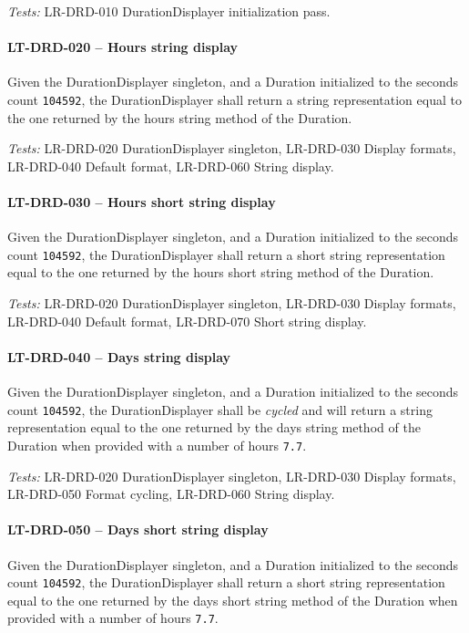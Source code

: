 \textit{Tests: } LR-DRD-010 DurationDisplayer initialization pass.

\paragraph{LT-DRD-020 -- Hours string display}
Given the DurationDisplayer singleton, and a Duration initialized
to the seconds count \lstinline{104592}, the DurationDisplayer
shall return a string representation equal to the one returned
by the hours string method of the Duration.

\textit{Tests: } LR-DRD-020 DurationDisplayer singleton,
LR-DRD-030 Display formats, LR-DRD-040 Default format, LR-DRD-060 String
display.

\paragraph{LT-DRD-030 -- Hours short string display}
Given the DurationDisplayer singleton, and a Duration initialized
to the seconds count \lstinline{104592}, the DurationDisplayer
shall return a short string representation equal to the one
returned by the hours short string method of the Duration.

\textit{Tests: } LR-DRD-020 DurationDisplayer singleton,
LR-DRD-030 Display formats, LR-DRD-040 Default format, LR-DRD-070 Short string
display.

\paragraph{LT-DRD-040 -- Days string display}
Given the DurationDisplayer singleton, and a Duration initialized
to the seconds count \lstinline{104592}, the DurationDisplayer
shall be \emph{cycled} and will return a string representation equal to
the one returned by the days string method of the Duration when provided
with a number of hours \lstinline{7.7}.

\textit{Tests: } LR-DRD-020 DurationDisplayer singleton,
LR-DRD-030 Display formats, LR-DRD-050 Format cycling, LR-DRD-060 String
display.

\paragraph{LT-DRD-050 -- Days short string display}
Given the DurationDisplayer singleton, and a Duration initialized
to the seconds count \lstinline{104592}, the DurationDisplayer
shall return a short string representation equal to
the one returned by the days short string method of the Duration when provided
with a number of hours \lstinline{7.7}.

